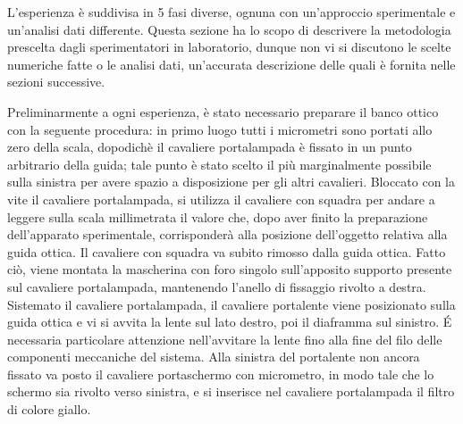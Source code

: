 L'esperienza \`e suddivisa in 5 fasi diverse, ognuna con 
un'approccio sperimentale e un'analisi dati differente. Questa 
sezione ha lo scopo di descrivere la metodologia prescelta dagli 
sperimentatori in laboratorio, dunque non vi si discutono le scelte 
numeriche fatte o le analisi dati, un'accurata descrizione delle 
quali è fornita nelle sezioni successive.

Preliminarmente a ogni esperienza, è stato necessario preparare il 
banco ottico con la seguente procedura: in primo luogo tutti i 
micrometri sono portati allo zero della scala, dopodichè il 
cavaliere portalampada \`e fissato in un punto arbitrario della 
guida; tale punto è stato scelto il più marginalmente possibile 
sulla sinistra per avere spazio a disposizione per gli altri 
cavalieri. Bloccato con la vite il cavaliere portalampada, si 
utilizza il cavaliere con squadra per andare a leggere sulla scala 
millimetrata il valore che, dopo aver finito la preparazione 
dell'apparato sperimentale, corrisponder\`a alla posizione 
dell'oggetto relativa alla guida ottica. Il cavaliere con squadra va 
subito rimosso dalla guida ottica. Fatto ciò, viene montata la 
mascherina con foro singolo sull'apposito supporto presente sul 
cavaliere portalampada, mantenendo l'anello di fissaggio rivolto a 
destra. \newline Sistemato il cavaliere portalampada, il cavaliere 
portalente viene posizionato sulla guida ottica e vi si avvita la 
lente sul lato destro, poi il diaframma sul sinistro. \'E necessaria 
particolare attenzione nell'avvitare la lente fino alla fine del 
filo delle componenti meccaniche del sistema. Alla sinistra del 
portalente non ancora fissato va posto il cavaliere portaschermo con 
micrometro, in modo tale che lo schermo sia rivolto verso sinistra, 
e si inserisce nel cavaliere portalampada il filtro di colore giallo.

